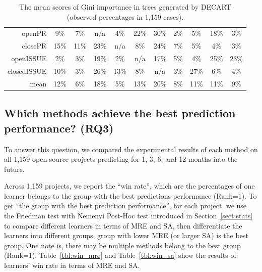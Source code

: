 \documentclass[smallextended]{svjour3}
\newcommand{\tbl}[1]{Table~\ref{tbl:#1}}
\newcommand{\respto}[1]{
\fcolorbox{black}{black!15}{%
\label{resp:#1}%
\bf\scriptsize R{#1}}}
\newcommand{\BLUE}{\color{blue}}
\newcommand{\BLACK}{\color{black}}
\begin{document}
\begin{table}[!b]
\begin{adjustbox}{max width=0.96\textwidth}
\begin{tabular}{r|cccccccccc}
openPR      & \cellcolor[HTML]{C8C8C8}9\%  & \cellcolor[HTML]{CCCCCC}7\%  & \cellcolor[HTML]{F4CCCC}n/a  & \cellcolor[HTML]{E2E2E2}4\%  & \cellcolor[HTML]{ABABAB}22\% & \cellcolor[HTML]{9C9C9C}30\%                         & \cellcolor[HTML]{EFEFEF}2\%  & \cellcolor[HTML]{DADADA}5\%  & \cellcolor[HTML]{B4B4B4}18\% & \cellcolor[HTML]{E9E9E9}3\%  \\
closePR     & \cellcolor[HTML]{B6B6B6}15\% & \cellcolor[HTML]{C3C3C3}11\% & \cellcolor[HTML]{9D9D9D}23\% & \cellcolor[HTML]{F4CCCC}n/a  & \cellcolor[HTML]{D3D3D3}8\%                          & \cellcolor[HTML]{A3A3A3}24\%                         & \cellcolor[HTML]{D3D3D3}7\%  & \cellcolor[HTML]{E1E1E1}5\%  & \cellcolor[HTML]{E8E8E8}4\%  & \cellcolor[HTML]{EFEFEF}3\%  \\
openISSUE   & \cellcolor[HTML]{EFEFEF}2\%  & \cellcolor[HTML]{E4E4E4}3\%  & \cellcolor[HTML]{A9A9A9}19\% & \cellcolor[HTML]{EFEFEF}2\%  & \cellcolor[HTML]{F4CCCC}n/a  & \cellcolor[HTML]{AEAEAE}17\% & \cellcolor[HTML]{CCCCCC}5\%  & \cellcolor[HTML]{D8D8D8}4\%  & \cellcolor[HTML]{999999}25\% & \cellcolor[HTML]{9F9F9F}23\% \\
closedISSUE & \cellcolor[HTML]{C7C7C7}10\% & \cellcolor[HTML]{EFEFEF}3\%  & \cellcolor[HTML]{9C9C9C}26\% & \cellcolor[HTML]{BFBFBF}13\% & \cellcolor[HTML]{DADADA}8\%                          & \cellcolor[HTML]{F4CCCC}n/a  & \cellcolor[HTML]{EFEFEF}3\%  & \cellcolor[HTML]{999999}27\% & \cellcolor[HTML]{DADADA}6\%  & \cellcolor[HTML]{E8E8E8}4\% \\ \hline
\rowcolor[HTML]{FFFFFF} 
mean & 12\% & 6\% & 18\% & 5\% & 13\% & 20\% & 8\% & 11\% & 11\% & 9\%
\end{tabular}
\end{adjustbox}
\caption{
The mean scores of Gini importance in trees generated by DECART (observed percentages in 1,159 cases).}
\label{tbl:frq}
\end{table}

\subsection{Which methods achieve the best prediction performance? (RQ3)}
To answer this question, 
we compared the experimental results of each method on all 1,159 open-source projects predicting for 1, 3, 6, and 12 months into the future.  

\respto{2I}
\BLUE
Across 1,159 projects, we report the ``win rate'', which are the percentages of one learner belongs to the group with the best predictions performance (Rank=1). To get ``the group with the best prediction performance'', for each project, we use the Friedman test with Nemenyi Post-Hoc test introduced in Section~\ref{sect:stats} to compare different learners in terms of MRE and SA, then differentiate the learners into different groups, group with lower MRE (or larger SA) is the best group. One note is, there may be multiple methods belong to the best group (Rank=1). \tbl{win_mre} and \tbl{win_sa} show the results of learners' win rate in terms of MRE and SA.
\BLACK
\end{document}
